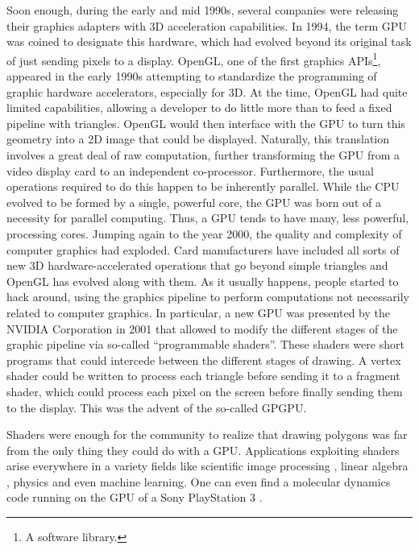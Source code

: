 \documentclass[ twoside,openright,titlepage,numbers=noenddot,%
headinclude,footinclude,cleardoublepage=empty,abstract=on,
BCOR=5mm,paper=b5,fontsize=11pt, dvipsnames
]{scrreprt}
\newcommand{\gpu}{\gls{GPU}\xspace}
\begin{document}
Soon enough, during the early and mid 1990s, several companies were releasing their graphics adapters with 3D acceleration capabilities. In 1994, the term \gpu was coined to designate this hardware, which had evolved beyond its original task of just sending pixels to a display.
OpenGL\cite{opengl}, one of the first graphics \glspl{API}\footnote{A software library.}, appeared in the early 1990s attempting to standardize the programming of graphic hardware accelerators, especially for 3D.
At the time, OpenGL had quite limited capabilities, allowing a developer to do little more than to feed a fixed pipeline with triangles. OpenGL would then interface with the \gpu to turn this geometry into a 2D image that could be displayed.
Naturally, this translation involves a great deal of raw computation, further transforming the \gpu from a video display card to an independent co-processor. Furthermore,  the usual operations required to do this happen to be inherently parallel. While the CPU evolved to be formed by a single, powerful core, the \gpu was born out of a necessity for parallel computing. Thus, a \gpu tends to have many, less powerful, processing cores.
Jumping again to the year 2000, the quality and complexity of computer graphics had exploded. Card manufacturers have included all sorts of new 3D hardware-accelerated operations that go beyond simple triangles and OpenGL has evolved along with them. As it usually happens, people started to hack around, using the graphics pipeline to perform computations not necessarily related to computer graphics. In particular, a new \gpu was presented by the NVIDIA Corporation in 2001 that allowed to modify the different stages of the graphic pipeline via so-called ``programmable shaders''. These shaders were short programs that could intercede between the different stages of drawing. A vertex shader could be written to process each triangle before sending it to a fragment shader, which could process each pixel on the screen before finally sending them to the display. This was the advent of the so-called \gls{GPGPU}.

Shaders were enough for the community to realize that drawing polygons was far from the only thing they could do with a \gpu\cite{gpgpu2002}. Applications exploiting shaders arise everywhere in a variety fields like scientific image processing \cite{gpuimage2003, gpuimage2006}, linear algebra \cite{gpulinalg2001, gpulinalg2003a, gpulinalg2003b}, physics \cite{gpulbm2004} and even machine learning\cite{gpuml2005, gpuml1998}. One can even find a molecular dynamics code running on the \gpu of a Sony PlayStation 3 \cite{ps3md2009}.
\end{document}
